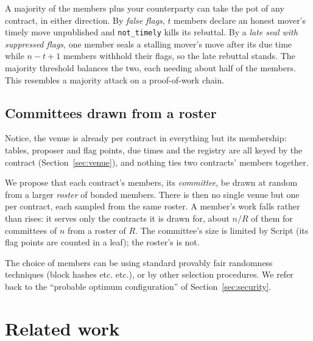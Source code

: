 \documentclass[11pt]{article}
\begin{document}
A majority of the members plus your counterparty can take the pot of any contract, in either
direction. By \emph{false flags}, $t$ members declare an honest mover's
timely move unpublished and \texttt{not\_timely} kills its rebuttal.
By a \emph{late seal with suppressed flags}, one member seals a stalling
mover's move after its due time while $n - t + 1$ members withhold their
flags, so the late rebuttal stands. The majority threshold balances
the two, each needing about half of the members. This resembles a
majority attack on a proof-of-work chain.

\subsection{Committees drawn from a roster}
\label{sec:roster}

Notice, the venue is already per contract in everything but its membership: tables, proposer and flag points, due times and the registry are all keyed by the contract
(Section~\ref{sec:venue}), and nothing ties two contracts' members together.

We propose that each contract's members, its \emph{committee}, be drawn at random from a larger \emph{roster} of bonded members. There is then no single venue but one per contract, each sampled from the same roster. A member's work falls rather than rises: it serves only the contracts it is drawn for, about $n/R$ of them for committees of $n$ from a roster of $R$. The committee's size is limited by Script (its flag points are counted in a leaf); the roster's is not.

The choice of members can be using standard provably fair randomness techniques (block hashes etc. etc.), or by other selection procedures. We refer back to the ``probable optimum configuration'' of Section~\ref{sec:security}.

\section{Related work}
\label{sec:related}
\end{document}
